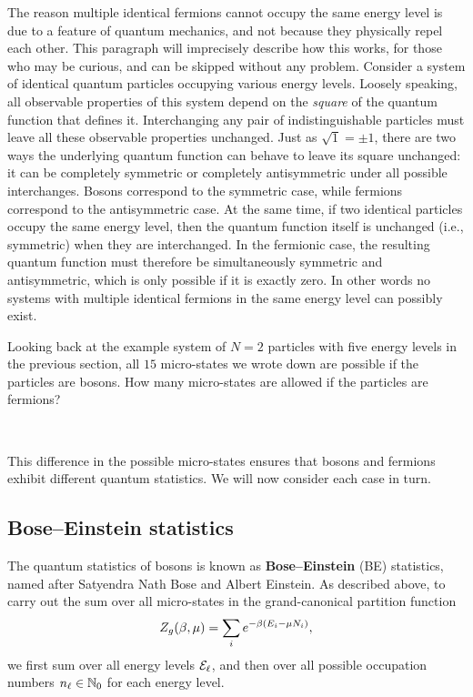 The reason multiple identical fermions cannot occupy the same energy level is due to a feature of quantum mechanics, and not because they physically repel each other.
This paragraph will imprecisely describe how this works, for those who may be curious, and can be skipped without any problem.
Consider a system of identical quantum particles occupying various energy levels.
Loosely speaking, all observable properties of this system depend on the \emph{square} of the quantum function that defines it.
Interchanging any pair of indistinguishable particles must leave all these observable properties unchanged.
Just as $\sqrt{1} = \pm 1$, there are two ways the underlying quantum function can behave to leave its square unchanged: it can be completely symmetric or completely antisymmetric under all possible interchanges.
Bosons correspond to the symmetric case, while fermions correspond to the antisymmetric case.
At the same time, if two identical particles occupy the same energy level, then the quantum function itself is unchanged (i.e., symmetric) when they are interchanged.
In the fermionic case, the resulting quantum function must therefore be simultaneously symmetric and antisymmetric, which is only possible if it is exactly zero.
In other words no systems with multiple identical fermions in the same energy level can possibly exist.

Looking back at the example system of $N = 2$ particles with five energy levels in the previous section, all $15$ micro-states we wrote down are possible if the particles are bosons.
How many micro-states are allowed if the particles are fermions?
\begin{mdframed}
  \ \\[15 pt]
\end{mdframed}
This difference in the possible micro-states ensures that bosons and fermions exhibit different quantum statistics.
We will now consider each case in turn.



\subsection{\label{sec:bose}Bose--Einstein statistics}
The quantum statistics of bosons is known as \textbf{Bose--Einstein} (BE) statistics, named after Satyendra Nath Bose and Albert Einstein.
As described above, to carry out the sum over all micro-states in the grand-canonical partition function
\begin{equation*}
  Z_g(\beta, \mu) = \sum_i e^{-\beta (E_i - \mu N_i)},
\end{equation*}
we first sum over all energy levels $\mathcal E_{\ell}$, and then over all possible occupation numbers $n_{\ell} \in \mathbb N_0$ for each energy level.

